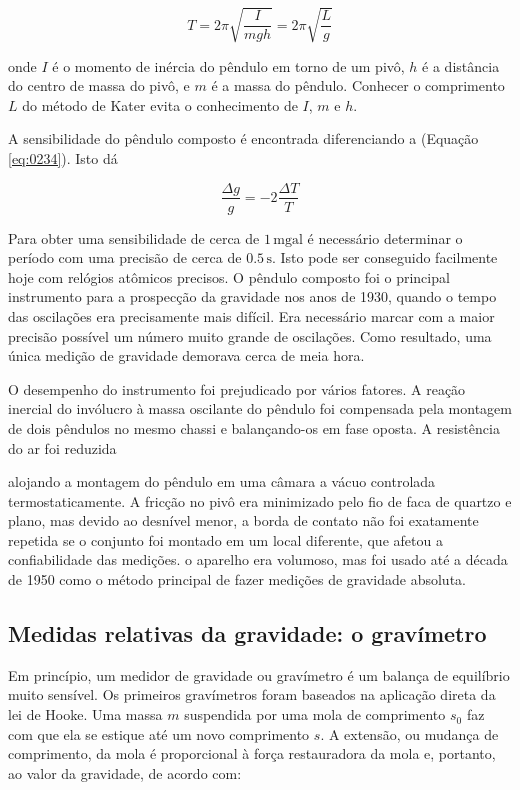 \documentclass[]{book}
\theoremstyle{definition}
\theoremstyle{definition}
\theoremstyle{definition}
\theoremstyle{remark}
\begin{document}
\begin{equation}
T=2 \pi \sqrt{\frac{I}{m g h}}=2 \pi \sqrt{\frac{L}{g}}  \label{eq:0234}
\end{equation}

onde \(I\) é o momento de inércia do pêndulo em torno de um pivô, \(h\) é a distância do centro de massa do pivô, e \(m\) é a massa do pêndulo. Conhecer o comprimento \(L\) do método de Kater evita o conhecimento de \(I\), \(m\) e \(h\).

A sensibilidade do pêndulo composto é encontrada diferenciando a (Equação \eqref{eq:0234}). Isto dá

\begin{equation}
\frac{\Delta g}{g}=-2 \frac{\Delta T}{T} \label{eq:0235}
\end{equation}

Para obter uma sensibilidade de cerca de \(1\,\mathrm{mgal}\) é necessário determinar o período com uma precisão de cerca de \(0.5 \,\mathrm{s}\). Isto pode ser conseguido facilmente hoje com relógios atômicos precisos. O pêndulo composto foi o principal instrumento para a prospecção da gravidade nos anos de 1930, quando o tempo das oscilações era precisamente mais difícil. Era necessário marcar com a maior precisão possível um número muito grande de oscilações. Como resultado, uma única medição de gravidade demorava cerca de meia hora.

O desempenho do instrumento foi prejudicado por vários fatores. A reação inercial do invólucro à massa oscilante do pêndulo foi compensada pela montagem de dois pêndulos no mesmo chassi e balançando-os em fase oposta. A resistência do ar foi reduzida

alojando a montagem do pêndulo em uma câmara a vácuo controlada termostaticamente. A fricção no pivô era minimizado pelo fio de faca de quartzo e plano, mas devido ao desnível menor, a borda de contato não foi exatamente repetida se o conjunto foi montado em um local diferente, que afetou a confiabilidade das medições. o aparelho era volumoso, mas foi usado até a década de 1950 como o método principal de fazer medições de gravidade absoluta.

\hypertarget{medidas-relativas-da-gravidade-o-gravimetro}{%
\subsection{Medidas relativas da gravidade: o gravímetro}\label{medidas-relativas-da-gravidade-o-gravimetro}}

Em princípio, um medidor de gravidade ou gravímetro é um balança de equilíbrio muito sensível. Os primeiros gravímetros foram baseados na aplicação direta da lei de Hooke. Uma massa \(m\) suspendida por uma mola de comprimento \(s_0\) faz com que ela se estique até um novo comprimento \(s\). A extensão, ou mudança de comprimento, da mola é proporcional à força restauradora da mola e, portanto, ao valor da gravidade, de acordo com:
\end{document}

